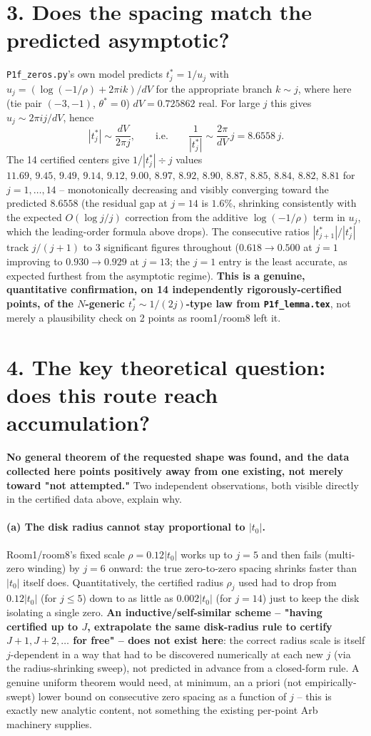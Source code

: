 \documentclass[11pt]{article}
\begin{document}
\section*{3. Does the spacing match the predicted asymptotic?}
\texttt{P1f\_zeros.py}'s own model predicts $t^*_j=1/u_j$ with $u_j=(\log(-1/\rho)+2\pi ik)/dV$ for
the appropriate branch $k\sim j$, where here (tie pair $(-3,-1)$, $\theta^*=0$) $dV=0.725862$ real.
For large $j$ this gives $u_j\sim2\pi ij/dV$, hence
\[
   |t^*_j|\sim\frac{dV}{2\pi j},\qquad\text{i.e.}\qquad \frac1{|t^*_j|}\sim\frac{2\pi}{dV}\,j
   =8.6558\,j.
\]
The 14 certified centers give $1/|t^*_j|\div j$ values
$11.69,\,9.45,\,9.49,\,9.14,\,9.12,\,9.00,\,8.97,\,8.92,\,8.90,\,8.87,\,8.85,\,8.84,\,8.82,\,8.81$
for $j=1,\ldots,14$ -- monotonically decreasing and visibly converging toward the predicted
$8.6558$ (the residual gap at $j=14$ is $1.6\%$, shrinking consistently with the expected
$O(\log j/j)$ correction from the additive $\log(-1/\rho)$ term in $u_j$, which the leading-order
formula above drops). The consecutive ratios $|t^*_{j+1}|/|t^*_j|$ track $j/(j+1)$ to 3 significant
figures throughout ($0.618\to0.500$ at $j=1$ improving to $0.930\to0.929$ at $j=13$; the $j=1$
entry is the least accurate, as expected furthest from the asymptotic regime). \textbf{This is a
genuine, quantitative confirmation, on 14 independently rigorously-certified points, of the
$N$-generic $t^*_j\sim1/(2j)$-type law from \texttt{P1f\_lemma.tex}}, not merely a plausibility
check on 2 points as room1/room8 left it.

\section*{4. The key theoretical question: does this route reach accumulation?}
\textbf{No general theorem of the requested shape was found, and the data collected here points
positively away from one existing, not merely toward "not attempted."} Two independent
observations, both visible directly in the certified data above, explain why.

\paragraph{(a) The disk radius cannot stay proportional to $|t_0|$.} Room1/room8's fixed scale
$\rho=0.12|t_0|$ works up to $j=5$ and then fails (multi-zero winding) by $j=6$ onward: the true
zero-to-zero spacing shrinks faster than $|t_0|$ itself does. Quantitatively, the certified radius
$\rho_j$ used had to drop from $0.12|t_0|$ (for $j\le5$) down to as little as $0.002|t_0|$ (for
$j=14$) just to keep the disk isolating a single zero. \textbf{An inductive/self-similar scheme --
"having certified up to $J$, extrapolate the same disk-radius rule to certify $J+1,J+2,\ldots$ for
free" -- does not exist here}: the correct radius scale is itself $j$-dependent in a way that had to
be discovered numerically at each new $j$ (via the radius-shrinking sweep), not predicted in advance
from a closed-form rule. A genuine uniform theorem would need, at minimum, an a priori (not
empirically-swept) lower bound on consecutive zero spacing as a function of $j$ -- this is exactly
new analytic content, not something the existing per-point Arb machinery supplies.
\end{document}
